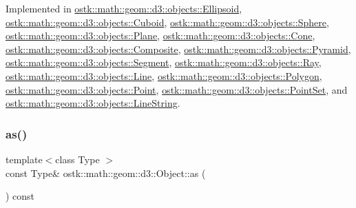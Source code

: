 Implemented in \hyperlink{classostk_1_1math_1_1geom_1_1d3_1_1objects_1_1_ellipsoid_aa7c60b942f6b1fa3a513bc3b549ab9e6}{ostk\+::math\+::geom\+::d3\+::objects\+::\+Ellipsoid}, \hyperlink{classostk_1_1math_1_1geom_1_1d3_1_1objects_1_1_cuboid_aaa90106ccf8120f854bdcf0f824e5610}{ostk\+::math\+::geom\+::d3\+::objects\+::\+Cuboid}, \hyperlink{classostk_1_1math_1_1geom_1_1d3_1_1objects_1_1_sphere_a421357bf4058e68e0aa636f606c6b249}{ostk\+::math\+::geom\+::d3\+::objects\+::\+Sphere}, \hyperlink{classostk_1_1math_1_1geom_1_1d3_1_1objects_1_1_plane_a4d96743e35df811f8c725561d353e245}{ostk\+::math\+::geom\+::d3\+::objects\+::\+Plane}, \hyperlink{classostk_1_1math_1_1geom_1_1d3_1_1objects_1_1_cone_a9b783e16344d65dfba68c63d1adca3e1}{ostk\+::math\+::geom\+::d3\+::objects\+::\+Cone}, \hyperlink{classostk_1_1math_1_1geom_1_1d3_1_1objects_1_1_composite_a2d99d6b4096c2f5ba3175f886e2e2c7d}{ostk\+::math\+::geom\+::d3\+::objects\+::\+Composite}, \hyperlink{classostk_1_1math_1_1geom_1_1d3_1_1objects_1_1_pyramid_ab4f31049019c0ea4b87931adf4ba7c5d}{ostk\+::math\+::geom\+::d3\+::objects\+::\+Pyramid}, \hyperlink{classostk_1_1math_1_1geom_1_1d3_1_1objects_1_1_segment_a5d2aba754d42c89224c7579944de9c4f}{ostk\+::math\+::geom\+::d3\+::objects\+::\+Segment}, \hyperlink{classostk_1_1math_1_1geom_1_1d3_1_1objects_1_1_ray_abdbc52aa6745f9d9601a8138a519d828}{ostk\+::math\+::geom\+::d3\+::objects\+::\+Ray}, \hyperlink{classostk_1_1math_1_1geom_1_1d3_1_1objects_1_1_line_ab12eb788b966601d6d09f75196a30d6f}{ostk\+::math\+::geom\+::d3\+::objects\+::\+Line}, \hyperlink{classostk_1_1math_1_1geom_1_1d3_1_1objects_1_1_polygon_abf60fe8602485822f8f07c01f6980cf5}{ostk\+::math\+::geom\+::d3\+::objects\+::\+Polygon}, \hyperlink{classostk_1_1math_1_1geom_1_1d3_1_1objects_1_1_point_a0b79a5726ac04f814b8a5b737daf0028}{ostk\+::math\+::geom\+::d3\+::objects\+::\+Point}, \hyperlink{classostk_1_1math_1_1geom_1_1d3_1_1objects_1_1_point_set_af03e071aa9d7a364a0c76f563b65a57e}{ostk\+::math\+::geom\+::d3\+::objects\+::\+Point\+Set}, and \hyperlink{classostk_1_1math_1_1geom_1_1d3_1_1objects_1_1_line_string_a8d1b47e4f9e314a5fc7df353c808dbc2}{ostk\+::math\+::geom\+::d3\+::objects\+::\+Line\+String}.

\mbox{\label{classostk_1_1math_1_1geom_1_1d3_1_1_object_ad921120c3bf1176035258fad0f654137}} 
\subsubsection{\texorpdfstring{as()}{as()}}
{\footnotesize\ttfamily template$<$class Type $>$ \\
const Type\& ostk\+::math\+::geom\+::d3\+::\+Object\+::as (\begin{DoxyParamCaption}{ }\end{DoxyParamCaption}) const\hspace{0.3cm}{\ttfamily [inline]}}



